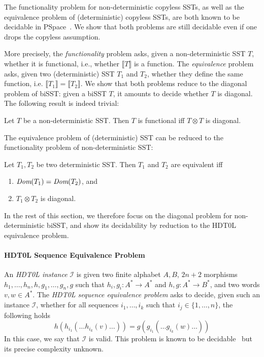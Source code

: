 \documentclass{llncs}
\newcommand\inter[1]{\llbracket #1 \rrbracket}
\begin{document}
The functionality problem for non-deterministic copyless SSTs, as well as
the equivalence problem of (deterministic) copyless SSTs, are both known to be
decidable in \textsf{PSpace}~\cite{conf/icalp/AlurD11}. We show that both problems are
still decidable even if one drops the copyless assumption. 


More precisely, the \emph{functionality} problem asks, given a non-deterministic SST $T$, whether it is
functional, i.e., whether $\inter{T}$ is a function. The
\emph{equivalence} problem asks, given two (deterministic) SST $T_1$
and $T_2$, whether they define the same function, i.e. $\inter{T_1} =
\inter{T_2}$. We show that both problems reduce to the diagonal
problem of biSST: given a biSST $T$, it amounts to decide whether $T$
is diagonal. The following result is indeed trivial:


\begin{proposition}
    Let $T$ be a non-deterministic SST. Then $T$ is functional iff 
    $T\otimes T$ is diagonal. 
\end{proposition}

The equivalence problem of (deterministic) SST can be reduced to the
functionality problem of non-deterministic SST:
 
\begin{proposition}
    Let $T_1,T_2$ be two deterministic SST. Then $T_1$ and $T_2$
    are equivalent iff 
    \begin{enumerate}
        \item $\textit{Dom}(T_1) = \textit{Dom}(T_2)$, and
        \item $T_1\otimes T_2$ is diagonal.
    \end{enumerate}
\end{proposition}


In the rest of this section, we therefore focus on the diagonal
problem for non-deterministic biSST, and show its decidability by reduction to the HDT0L
equivalence problem. 



\paragraph{HDT0L Sequence Equivalence Problem} 
An \emph{HDT0L instance} $\mathcal{I}$ is given two finite alphabet $A,B$, $2n+2$ morphisms $h_1,\dots,h_n,h,g_1,\dots,g_n,g$ such that
$h_i,g_i:A^*\rightarrow A^*$ and $h,g:A^*\rightarrow B^*$, and two words $v,w\in A^*$. 
The \emph{HDT0L sequence equivalence problem} asks
to decide, given such an instance $\mathcal{I}$, whether for all  sequences $i_1,\dots,i_k$ such that $i_j\in
\{1,\dots,n\}$, the following holds
$$
h(h_{i_1}(\dots h_{i_k}(v)\dots)) = 
g(g_{i_1}(\dots g_{i_k}(w)\dots))
$$
In this case, we say that $\mathcal{I}$ is valid. 
This problem is known to be decidable~\cite{DBLP:journals/tcs/CulikK86} but its precise
complexity unknown.
\end{document}
